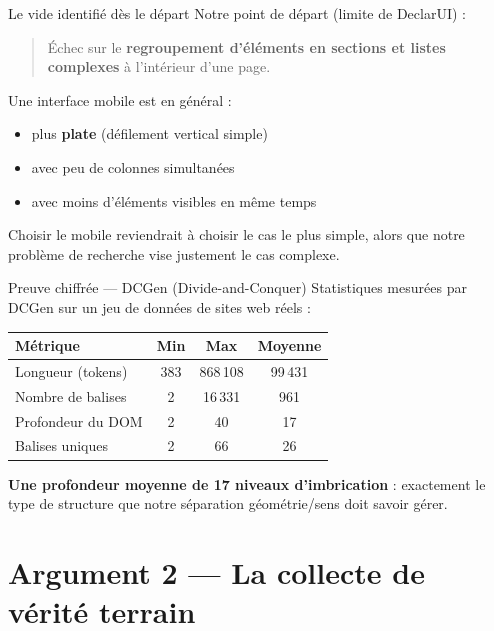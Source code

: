 \documentclass[11pt]{beamer}
\begin{document}
\begin{frame}{Le vide identifié dès le départ}
  Notre point de départ (limite de DeclarUI) :

  \begin{quote}
    Échec sur le \textbf{regroupement d'éléments en sections et listes
    complexes} à l'intérieur d'une page.
  \end{quote}

  \vspace{1em}
  Une interface mobile est en général :
  \begin{itemize}
    \item plus \textbf{plate} (défilement vertical simple)
    \item avec peu de colonnes simultanées
    \item avec moins d'éléments visibles en même temps
  \end{itemize}

  \vspace{1em}
  \alert{Choisir le mobile reviendrait à choisir le cas le plus simple, alors
  que notre problème de recherche vise justement le cas complexe.}
\end{frame}

\begin{frame}{Preuve chiffrée --- DCGen (Divide-and-Conquer)}
  Statistiques mesurées par DCGen sur un jeu de données de sites web réels :

  \vspace{1em}
  \begin{table}
    \centering
    \begin{tabular}{lccc}
      \toprule
      Métrique & Min & Max & Moyenne \\
      \midrule
      Longueur (tokens) & 383 & 868\,108 & 99\,431 \\
      Nombre de balises & 2 & 16\,331 & 961 \\
      Profondeur du DOM & 2 & 40 & 17 \\
      Balises uniques & 2 & 66 & 26 \\
      \bottomrule
    \end{tabular}
  \end{table}

  \vspace{1em}
  \textbf{Une profondeur moyenne de 17 niveaux d'imbrication} : exactement le
  type de structure que notre séparation géométrie/sens doit savoir gérer.
\end{frame}

\section{Argument 2 --- La collecte de vérité terrain}
\end{document}
